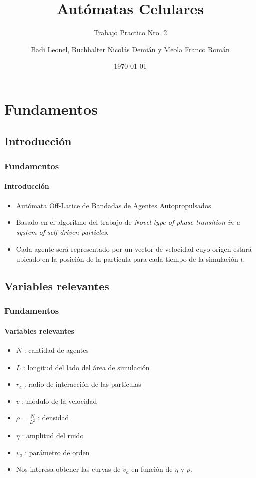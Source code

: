 \documentclass[hyperref={pdfpagelayout=SinglePage}]{beamer}
\title{Autómatas Celulares}
\subtitle{Trabajo Practico Nro. 2}
\author{Badi Leonel, Buchhalter Nicolás Demián y Meola Franco Román}
\date{\today}
\begin{document}
\renewcommand{\figurename}{Grafico}

\begin{frame}[plain]
    \frametitle{} 
    \titlepage
\end{frame}

\section{Fundamentos}

\subsection{Introducción}

\begin{frame}
\frametitle{Fundamentos}
\framesubtitle{Introducción}
\begin{itemize}
	\item Autómata Off-Latice de Bandadas de Agentes Autopropulsados.
	\item Basado en el algoritmo del trabajo de \textit{Novel type of phase transition in a system of self-driven particles}.
	\item Cada agente será representado por un vector de velocidad cuyo origen estará ubicado en la posición de la partícula para cada tiempo de la simulación $t$.
\end{itemize}
\end{frame}

\subsection{Variables relevantes}

\begin{frame}
\frametitle{Fundamentos}
\framesubtitle{Variables relevantes}
\begin{itemize}
	\item $N$ : cantidad de agentes
	\item $L$ : longitud del lado del área de simulación
	\item $r_{c}$ : radio de interacción de las partículas
	\item $v$ : módulo de la velocidad
	\item $\rho = \frac{N}{L^2}$ : densidad
	\item $\eta$ : amplitud del ruido
	\item $v_{a}$ : parámetro de orden
	\item Nos interesa obtener las curvas de  $v_{a}$ en función de $\eta$ y $\rho$.
\end{itemize}
\end{frame}
\end{document}

